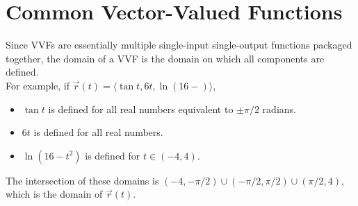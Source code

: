 \section{Common Vector-Valued Functions}



\noindent
Since VVFs are essentially multiple single-input single-output functions packaged together, the domain of a VVF is the domain on which all components are defined.\\

\noindent
For example, if $\vec{r}(t)=\langle \tan{t},6t,\ln{\left(16-\right)} \rangle$,
\begin{itemize}
	\item $\tan{t}$ is defined for all real numbers equivalent to $\pm\pi/2$ radians.
	\item $6t$ is defined for all real numbers.
	\item $\ln{\left(16-t^2\right)}$ is defined for $t\in\left(-4,4\right)$.
\end{itemize}
The intersection of these domains is $\left(-4,-\pi/2\right)\cup\left(-\pi/2,\pi/2\right)\cup\left(\pi/2,4\right)$, which is the domain of $\vec{r}(t)$.